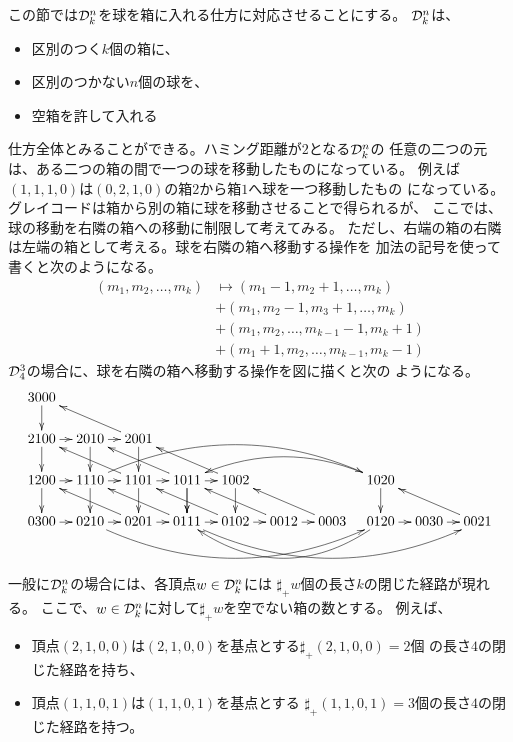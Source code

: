 	この節では${\mathcal{D}}_k^n$を球を箱に入れる仕方に対応させることにする。
	${\mathcal{D}}_k^n$は、
	\begin{itemize}\setlength{\itemsep}{-1mm} %
		\item 区別のつく$k$個の箱に、
		\item 区別のつかない$n$個の球を、
		\item 空箱を許して入れる
	\end{itemize} %
	仕方全体とみることができる。ハミング距離が$2$となる${\mathcal{D}}_k^n$の
	任意の二つの元は、ある二つの箱の間で一つの球を移動したものになっている。
	例えば$(1,1,1,0)$は$(0,2,1,0)$の箱$2$から箱$1$へ球を一つ移動したもの
	になっている。グレイコードは箱から別の箱に球を移動させることで得られるが、
	ここでは、球の移動を右隣の箱への移動に制限して考えてみる。
	ただし、右端の箱の右隣は左端の箱として考える。球を右隣の箱へ移動する操作を
	加法の記号を使って書くと次のようになる。
	\begin{equation*}\begin{split} %
		(m_1,m_2,\dots,m_k) &\mapsto (m_1-1,m_2+1,\dots,m_k) \\
		&+ (m_1,m_2-1,m_3+1,\dots,m_k) \\
		&+ (m_1,m_2,\dots,m_{k-1}-1,m_k+1) \\
		&+ (m_1+1,m_2,\dots,m_{k-1},m_k-1)
	\end{split}\end{equation*} %
	${\mathcal{D}}_4^3$の場合に、球を右隣の箱へ移動する操作を図に描くと次の
	ようになる。
	\begin{equation*}\xymatrix@R=4ex@C=2ex{
		3000 \ar[d] \\
		2100 \ar[r] \ar[d] & 2010 \ar[r] \ar[d] & 2001 \ar[llu] \ar[d] \\
		1200 \ar[r] \ar[d] & 1110 \ar[r] \ar[d] \ar@/^6ex/[rrrrrr] 
			& 1101 \ar[r] \ar[llu] \ar[d] & 1011 \ar[r] \ar[d] \ar[llu] \ar[d] 
			& 1002 \ar[llu] \ar[d] & & & 1020 \ar@/_4ex/[llll] \ar[d] \\
		0300 \ar[r] & 0210 \ar[r] \ar@/_6ex/[rrrrrr] & 0201 \ar[r] \ar[llu] 
			& 0111 \ar[r] \ar[llu] \ar@/_6ex/[rrrrrr] & 0102 \ar[r] \ar[llu]
			& 0012 \ar[r] \ar[llu] & 0003 \ar[llu] 
			& 0120 \ar[r] \ar@/^6ex/[llll] & 0030 \ar[r] & 0021 \ar[llu] \\
			\\
	}\end{equation*}
	一般に${\mathcal{D}}_k^n$の場合には、各頂点$w\in{\mathcal{D}}_k^n$には
	$\sharp_+w$個の長さ$k$の閉じた経路が現れる。
	ここで、$w\in{\mathcal{D}}_k^n$に対して$\sharp_+w$を空でない箱の数とする。
	例えば、
	\begin{itemize}\setlength{\itemsep}{-1mm} %
		\item 頂点$(2,1,0,0)$は$(2,1,0,0)$を基点とする$\sharp_+(2,1,0,0)=2$個
		の長さ$4$の閉じた経路を持ち、
		\item 頂点$(1,1,0,1)$は$(1,1,0,1)$を基点とする
		$\sharp_+(1,1,0,1)=3$個の長さ$4$の閉じた経路を持つ。
	\end{itemize} %
